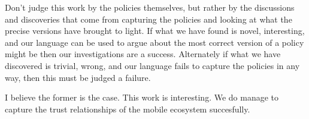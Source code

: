 \documentclass[thesis.tex]{subfiles}
\begin{document}
Don't judge this work by the policies themselves, but rather by the discussions
and discoveries that come from capturing the policies and looking at what the
precise versions have brought to light.  If what we have found is novel,
interesting, and our language can be used to argue about the most correct
version of a policy might be then our investigations are a success.
Alternately if what we have discovered is trivial, wrong, and our language
fails to capture the policies in any way, then this must be judged a failure.

I believe the former is the case.  This work is interesting. We do manage to
capture the trust relationships of the mobile ecosystem succesfully.
\end{document}
